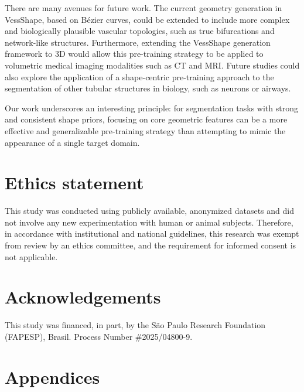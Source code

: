 \documentclass[%
reprint,
nofootinbib,
 amsmath,amssymb,
aps,
superscriptaddress,
showkeys,
longbibliography
]{revtex4-1}
\begin{document}
There are many avenues for future work. The current geometry generation in VessShape, based on Bézier curves, could be extended to include more complex and biologically plausible vascular topologies, such as true bifurcations and network-like structures. Furthermore, extending the VessShape generation framework to 3D would allow this pre-training strategy to be applied to volumetric medical imaging modalities such as CT and MRI. Future studies could also explore the application of a shape-centric pre-training approach to the segmentation of other tubular structures in biology, such as neurons or airways.

Our work underscores an interesting principle: for segmentation tasks with strong and consistent shape priors, focusing on core geometric features can be a more effective and generalizable pre-training strategy than attempting to mimic the appearance of a single target domain.

\section*{Ethics statement}

This study was conducted using publicly available, anonymized datasets and did not involve any new experimentation with human or animal subjects. Therefore, in accordance with institutional and national guidelines, this research was exempt from review by an ethics committee, and the requirement for informed consent is not applicable.

\section*{Acknowledgements}
This study was financed, in part, by the São Paulo Research Foundation (FAPESP), Brasil. Process Number \#2025/04800-9.



\appendix
\section*{Appendices} %

\renewcommand{\thesection}{\Alph{section}}

\renewcommand{\thefigure}{\thesection\arabic{figure}}
\renewcommand{\theHfigure}{\thesection.\arabic{figure}}
\setcounter{figure}{0} %
\end{document}
